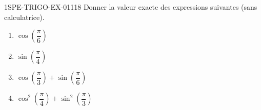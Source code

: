 \begin{exercice}{1SPE-TRIGO-EX-011}{1}{8}
Donner la valeur exacte des expressions suivantes (sans calculatrice).
\begin{enumerate}
  \item $\cos\!\left(\dfrac{\pi}{6}\right)$
  \item $\sin\!\left(\dfrac{\pi}{4}\right)$
  \item $\cos\!\left(\dfrac{\pi}{3}\right) + \sin\!\left(\dfrac{\pi}{6}\right)$
  \item $\cos^2\!\left(\dfrac{\pi}{4}\right) + \sin^2\!\left(\dfrac{\pi}{3}\right)$
\end{enumerate}
\end{exercice}
